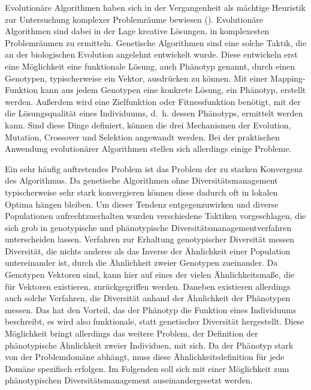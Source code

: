 Evolutionäre Algorithmen haben sich in der Vergangenheit als mächtige Heuristik zur Untersuchung komplexer Problemräume bewiesen (\cite{Yu.2010}).
Evolutionäre Algorithmen sind dabei in der Lage kreative Lösungen, in komplexesten Problemräumen zu ermitteln.
Genetische Algorithmen sind eine solche Taktik, die an der biologischen Evolution angelehnt entwickelt wurde.
Diese entwickeln erst eine Möglichkeit eine funktionale Lösung, auch Phänotyp genannt, durch einen Genotypen, typischerweise ein Vektor, ausdrücken zu können.
Mit einer Mapping-Funktion kann aus jedem Genotypen eine konkrete Lösung, ein Phänotyp, erstellt werden.
Außerdem wird eine Zielfunktion oder Fitnessfunktion benötigt, mit der die Lösungsqualität eines Individuums, d.~h. dessen Phänotyps, ermittelt werden kann.
Sind diese Dinge definiert, können die drei Mechanismen der Evolution, Mutation, Crossover und Selektion angewandt werden.
Bei der praktischen Anwendung evolutionärer Algorithmen stellen sich allerdings einige Probleme.

Ein sehr häufig auftretendes Problem ist das Problem der zu starken Konvergenz des Algorithmus.
Da genetische Algorithmen ohne Diversitätsmanagement typischerweise sehr stark konvergieren können diese dadurch oft in lokalen Optima hängen bleiben.
Um dieser Tendenz entgegenzuwirken und diverse Populationen aufrechtzuerhalten wurden verschiedene Taktiken vorgeschlagen, die sich grob in genotypische und phänotypische Diversitätsmanagementverfahren unterscheiden lassen.
Verfahren zur Erhaltung genotypischer Diversität messen Diversität, die nichts anderes als das Inverse der Ähnlichkeit einer Population untereinander ist, durch die Ähnlichkeit zweier Genotypen zueinander.
Da Genotypen Vektoren sind, kann hier auf eines der vielen Ähnlichkeitsmaße, die für Vektoren existieren, zurückgegriffen werden.
Daneben existieren allerdings auch solche Verfahren, die Diversität anhand der Ähnlichkeit der Phänotypen messen.
Das hat den Vorteil, das der Phänotyp die Funktion eines Individuums beschreibt, es wird also funktionale, statt genetischer Diversität hergestellt.
Diese Möglichkeit bringt allerdings das weitere Problem, der Definition der phänotypische Ähnlichkeit zweier Individuen, mit sich.
Da der Phänotyp stark von der Problemdomäne abhängt, muss diese Ähnlichkeitsdefinition für jede Domäne spezifisch erfolgen.
Im Folgenden soll sich mit einer Möglichkeit zum phänotypischen Diversitätsmanagement auseinandergesetzt werden.

